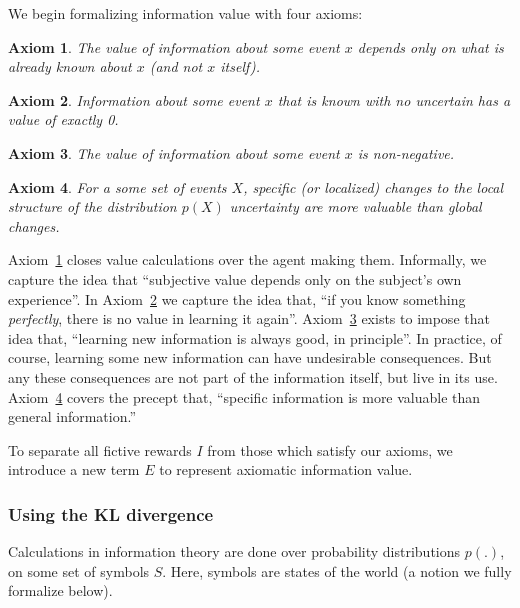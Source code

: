 \documentclass[9pt,twocolumn,twoside]{pnas-new}
\newtheorem{axiom}{Axiom}
\begin{document}
We begin formalizing information value with four axioms:

\begin{axiom}
    The value of information about some event $x$ depends \textit{only} on what is already known about $x$ (and not $x$ itself).    
    \label{ax:1}
\end{axiom}
\begin{axiom}
    Information about some event $x$ that is known with no uncertain has a value of exactly 0.
    \label{ax:2}
\end{axiom}
\begin{axiom}
    The value of information about some event $x$ is non-negative. 
    \label{ax:3}
\end{axiom}
\begin{axiom}
    For a some set of events $X$, specific (or localized) changes to the local structure of the distribution $p(X)$ uncertainty are more valuable than global changes.
    \label{ax:4}
\end{axiom}

Axiom~\ref{ax:1} closes value calculations over the agent making them. Informally, we capture the idea that ``subjective value depends only on the subject's own experience''.  In Axiom~\ref{ax:2} we capture the idea that, ``if you know something \textit{perfectly}, there is no value in learning it again''. Axiom~\ref{ax:3} exists to impose that idea that, ``learning new information is always good, in principle''. In practice, of course, learning some new information can have undesirable consequences. But any these consequences are not part of the information itself, but live in its use. Axiom~\ref{ax:4} covers the precept that, ``specific information is more valuable than general information.'' 

To separate all fictive rewards $I$ from those which satisfy our axioms, we introduce a new term $E$ to represent axiomatic information value.

\subsubsection*{Using the KL divergence}

Calculations in information theory are done over probability distributions $p(.)$, on some set of symbols $S$. Here, symbols are states of the world (a notion we fully formalize below). 
\end{document}
